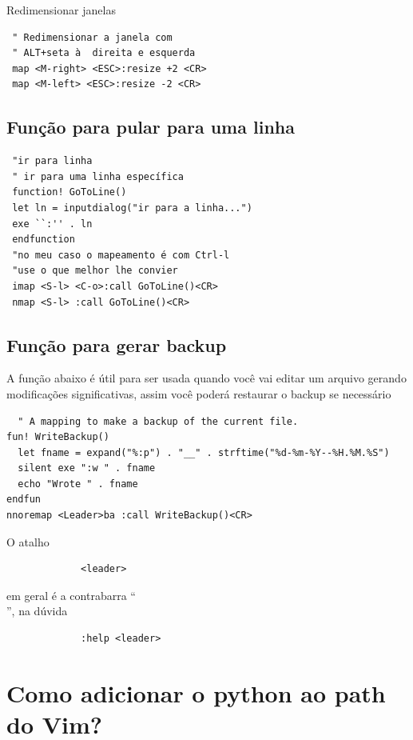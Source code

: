 \documentclass[10pt,a4paper,openany]{book}
\begin{document}
Redimensionar janelas

\begin{verbatim}
 " Redimensionar a janela com
 " ALT+seta à  direita e esquerda
 map <M-right> <ESC>:resize +2 <CR>
 map <M-left> <ESC>:resize -2 <CR>
\end{verbatim}

\subsection{Função para pular para uma linha}
\label{Função para pular para uma linha}

\begin{verbatim}
 "ir para linha
 " ir para uma linha específica
 function! GoToLine()
 let ln = inputdialog("ir para a linha...")
 exe ``:'' . ln
 endfunction
 "no meu caso o mapeamento é com Ctrl-l
 "use o que melhor lhe convier
 imap <S-l> <C-o>:call GoToLine()<CR>
 nmap <S-l> :call GoToLine()<CR>
\end{verbatim}

\subsection{Função para gerar backup}
\label{Função para gerar backup}

A função abaixo é útil para ser usada quando você vai editar um arquivo
gerando modificações significativas, assim você poderá restaurar o backup se necessário

\begin{verbatim}
  " A mapping to make a backup of the current file.
fun! WriteBackup()
  let fname = expand("%:p") . "__" . strftime("%d-%m-%Y--%H.%M.%S")
  silent exe ":w " . fname
  echo "Wrote " . fname
endfun
nnoremap <Leader>ba :call WriteBackup()<CR>
\end{verbatim}

O atalho

\begin{verbatim}
			 <leader>
\end{verbatim}

em geral é a contrabarra ``\\'', na dúvida

\begin{verbatim}
			 :help <leader>
\end{verbatim}

\section{Como adicionar o python ao path do Vim?}
\label{Como adicionar o python ao path do Vim?}
\end{document}
